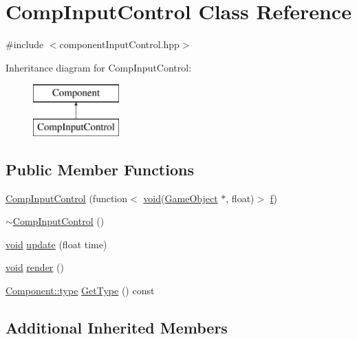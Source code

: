 \hypertarget{class_comp_input_control}{\section{Comp\-Input\-Control Class Reference}
\label{class_comp_input_control}
}


{\ttfamily \#include $<$component\-Input\-Control.\-hpp$>$}

Inheritance diagram for Comp\-Input\-Control\-:\begin{figure}[H]
\begin{center}
\leavevmode
\includegraphics[height=2.000000cm]{class_comp_input_control}
\end{center}
\end{figure}
\subsection*{Public Member Functions}
\begin{DoxyCompactItemize}
\item 
\hyperlink{class_comp_input_control_a3aabdba98654ac10d81cbe02560c8df0}{Comp\-Input\-Control} (function$<$ \hyperlink{_s_d_l__opengles2__gl2ext_8h_ae5d8fa23ad07c48bb609509eae494c95}{void}(\hyperlink{class_game_object}{Game\-Object} $\ast$, float)$>$ \hyperlink{_s_d_l__opengl__glext_8h_a691492ec0bd6383f91200e49f6ae40ed}{f})
\item 
\hyperlink{class_comp_input_control_a09f229c93365187d06c2c9efe6b168fb}{$\sim$\-Comp\-Input\-Control} ()
\item 
\hyperlink{_s_d_l__opengles2__gl2ext_8h_ae5d8fa23ad07c48bb609509eae494c95}{void} \hyperlink{class_comp_input_control_acd26d145112fbbfd2e94582f36e6535c}{update} (float time)
\item 
\hyperlink{_s_d_l__opengles2__gl2ext_8h_ae5d8fa23ad07c48bb609509eae494c95}{void} \hyperlink{class_comp_input_control_ae451f1ce791bf18d967dd768b164f59c}{render} ()
\item 
\hyperlink{class_component_ad6d161b6acf7b843b55bb9feac7af71a}{Component\-::type} \hyperlink{class_comp_input_control_a2e4ee7ab44ba39bb4d011af305717ff6}{Get\-Type} () const 
\end{DoxyCompactItemize}
\subsection*{Additional Inherited Members}


